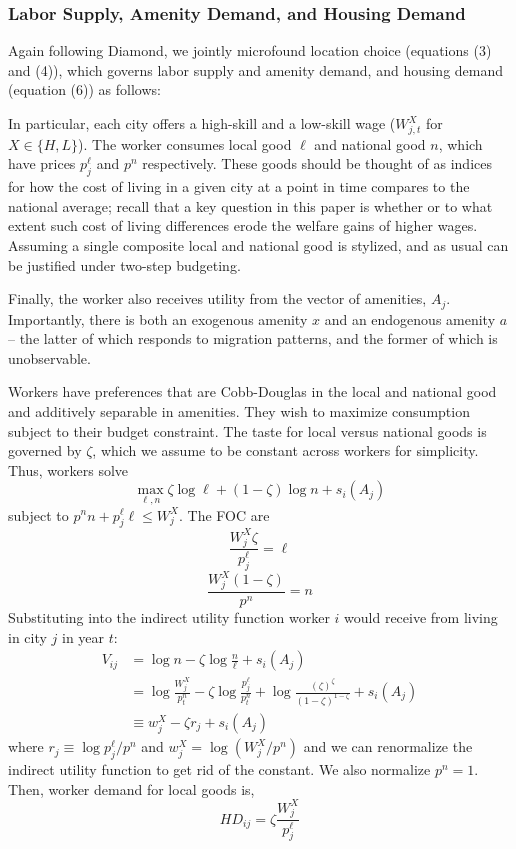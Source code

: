 \documentclass{article}
\begin{document}
\subsubsection{Labor Supply, Amenity Demand, and Housing Demand }

Again following Diamond, we jointly microfound location choice (equations (3) and (4)), which governs labor supply and amenity demand, and housing demand (equation (6)) as follows: 

In particular, each city offers a high-skill and a low-skill wage ($W_{j,t}^X$ for $X \in \{H, L\}$). The worker consumes local good $\ell$ and national good $n$, which have prices $p^\ell_{j}$ and $p^n$ respectively. These goods should be thought of as indices for how the cost of living in a given city at a point in time compares to the national average; recall that a key question in this paper is whether or to what extent such cost of living differences erode the welfare gains of higher wages. Assuming a single composite local and national good is stylized, and as usual can be justified under two-step budgeting.

Finally, the worker also receives utility from the vector of amenities, $A_{j}$. Importantly, there is both an exogenous amenity $x$ and an endogenous amenity $a$ -- the latter of which responds to migration patterns, and the former of which is unobservable.

Workers have preferences that are Cobb-Douglas in  the local and national good and additively separable in amenities. They wish to maximize consumption subject to their budget constraint. The taste for local versus national goods is governed by $\zeta$, which we assume to be constant across workers for simplicity. Thus, workers solve 
\begin{equation}\label{eq_worker_util_max}
    \max_{\ell,n} \zeta \log \ell + (1-\zeta)\log n + s_i(A_{j})
\end{equation}
subject to $p^n n + p^\ell_{j}\ell\leq W^X_{j}$. The FOC are
$$\frac{W^X_{j}\zeta}{p^\ell_{j}} = \ell$$
$$\frac{W^X_{j}(1-\zeta)}{p^n} = n$$
Substituting into the indirect utility function worker $i$ would receive from living in city $j$ in year $t$:
\begin{align}
    V_{ij} &= \log n - \zeta \log \frac{n}{\ell} + s_i(A_{j}) \nonumber \\ 
    &= \log \frac{W^X_{j}}{p^n_{t}} - \zeta \log\frac{p^\ell_{j}}{p^n_{t}} + \log\frac{(\zeta)^\zeta}{(1-\zeta)^{1-\zeta}} + s_i(A_{j})  \nonumber \\
    &\equiv w^X_{j} - \zeta r_{j} + s_i(A_{j})
\end{align}
where $r_{j} \equiv \log p_{j}^\ell/p^n$ and $w_{j}^X = \log (W_{j}^X/p^n)$ and we can renormalize the indirect utility function to get rid of the constant. We also normalize $p^n=1$.
Then, worker demand for local goods is,
\begin{equation}\label{eq_worker_local_demand}
    HD_{ij} = \zeta \frac{W^X_{j}}{p^\ell_{j}}
\end{equation}
\end{document}
